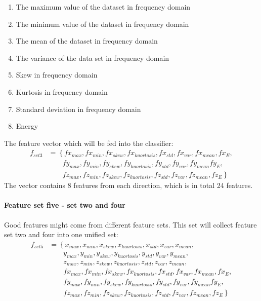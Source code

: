 \documentclass[USenglish]{ifimaster}  %
\begin{document}
\begin{enumerate}
		\item The maximum value of the dataset in frequency domain
		\item The minimum value of the dataset in frequency domain
		\item The mean of the dataset in frequency domain
		\item The variance of the data set in frequency domain
		\item Skew in frequency domain
		\item Kurtosis in frequency domain 
		\item Standard deviation in frequency domain
		\item Energy 
\end{enumerate}
The feature vector which will be fed into the classifier:
\begin{align}
	f_{set3} &= \left\{ fx_{max},fx_{min},fx_{skew},fx_{kuortosis},fx_{std},fx_{var},fx_{mean},fx_{E}, \right.\nonumber\\
	&\qquad \left. {} fy_{max},fy_{min},fy_{skew},fy_{kuortosis},fy_{std},fy_{var},fy_{mean}fy_{E}, \right.\nonumber\\
	&\qquad \left. {} fz_{max},fz_{min},fz_{skew},fz_{kuortosis},fz_{std},fz_{var},fz_{mean},fz_{E} \right\}
	\end{align}
The vector contains 8 features from each direction, which is in total 24 features. 
	
\paragraph{Feature set five - set two and four} 
Good features might come from different feature sets. This set will collect feature set two and four into one unified set:
	\begin{align}
	f_{set5} &= \left\{ x_{max},x_{min},x_{skew},x_{kuortosis},x_{std},x_{var},x_{mean}, \right.\nonumber\\
	&\qquad \left. {}   y_{max},y_{min},y_{skew},y_{kuortosis},y_{std},y_{var},y_{mean}, \right.\nonumber\\
	&\qquad \left. {}  z_{max},z_{min},z_{skew},z_{kuortosis},z_{std},z_{var},z_{mean}, \right.\nonumber\\
	&\qquad \left. {} fx_{max},fx_{min},fx_{skew},fx_{kuortosis},fx_{std},fx_{var},fx_{mean},fx_{E}, \right.\nonumber\\
	&\qquad \left. {} fy_{max},fy_{min},fy_{skew},fy_{kuortosis},fy_{std},fy_{var},fy_{mean}fy_{E}, \right.\nonumber\\
	&\qquad \left. {} fz_{max},fz_{min},fz_{skew},fz_{kuortosis},fz_{std},fz_{var},fz_{mean},fz_{E} \right\}
	\end{align}
	
\end{document}
